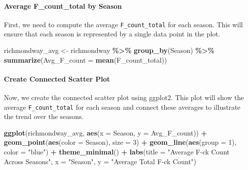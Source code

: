 \documentclass[
]{book}
\newenvironment{Shaded}{\begin{snugshade}}{\end{snugshade}}
\newcommand{\AttributeTok}[1]{\textcolor[rgb]{0.13,0.29,0.53}{#1}}
\newcommand{\DecValTok}[1]{\textcolor[rgb]{0.00,0.00,0.81}{#1}}
\newcommand{\FunctionTok}[1]{\textcolor[rgb]{0.13,0.29,0.53}{\textbf{#1}}}
\newcommand{\NormalTok}[1]{#1}
\newcommand{\OtherTok}[1]{\textcolor[rgb]{0.56,0.35,0.01}{#1}}
\newcommand{\SpecialCharTok}[1]{\textcolor[rgb]{0.81,0.36,0.00}{\textbf{#1}}}
\newcommand{\StringTok}[1]{\textcolor[rgb]{0.31,0.60,0.02}{#1}}
\begin{document}
\paragraph*{Average F\_count\_total by Season}\label{average-f_count_total-by-season}

First, we need to compute the average \texttt{F\_count\_total} for each season. This will ensure that each season is represented by a single data point in the plot.

\begin{Shaded}
\begin{Highlighting}[]
\NormalTok{richmondway\_avg }\OtherTok{\textless{}{-}}\NormalTok{ richmondway }\SpecialCharTok{\%\textgreater{}\%}
  \FunctionTok{group\_by}\NormalTok{(Season) }\SpecialCharTok{\%\textgreater{}\%}
  \FunctionTok{summarize}\NormalTok{(}\AttributeTok{Avg\_F\_count =} \FunctionTok{mean}\NormalTok{(F\_count\_total))}
\end{Highlighting}
\end{Shaded}

\paragraph*{Create Connected Scatter Plot}\label{create-connected-scatter-plot}

Now, we create the connected scatter plot using ggplot2. This plot will show the average \texttt{F\_count\_total} for each season and connect these averages to illustrate the trend over the seasons.

\begin{Shaded}
\begin{Highlighting}[]
\FunctionTok{ggplot}\NormalTok{(richmondway\_avg, }\FunctionTok{aes}\NormalTok{(}\AttributeTok{x =}\NormalTok{ Season, }\AttributeTok{y =}\NormalTok{ Avg\_F\_count)) }\SpecialCharTok{+}
  \FunctionTok{geom\_point}\NormalTok{(}\FunctionTok{aes}\NormalTok{(}\AttributeTok{color =}\NormalTok{ Season), }\AttributeTok{size =} \DecValTok{3}\NormalTok{) }\SpecialCharTok{+}
  \FunctionTok{geom\_line}\NormalTok{(}\FunctionTok{aes}\NormalTok{(}\AttributeTok{group =} \DecValTok{1}\NormalTok{), }\AttributeTok{color =} \StringTok{"blue"}\NormalTok{) }\SpecialCharTok{+}
  \FunctionTok{theme\_minimal}\NormalTok{() }\SpecialCharTok{+}
  \FunctionTok{labs}\NormalTok{(}\AttributeTok{title =} \StringTok{"Average F{-}ck Count Across Seasons"}\NormalTok{,}
       \AttributeTok{x =} \StringTok{"Season"}\NormalTok{,}
       \AttributeTok{y =} \StringTok{"Average Total F{-}ck Count"}\NormalTok{)}
\end{Highlighting}
\end{Shaded}
\end{document}

